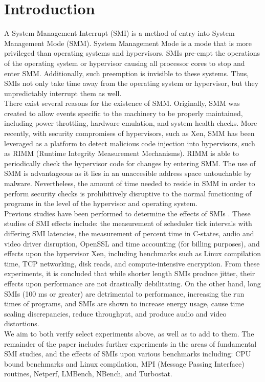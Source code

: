 \documentclass{IEEEtran}
\begin{document}
\section{Introduction}\label{sec:intro}
A System Management Interrupt (SMI) is a method of entry into System Management Mode (SMM). System Management Mode is a mode that is more privileged than operating systems and hypervisors. SMIs pre-empt the operations of the operating system or hypervisor causing all processor cores to stop and enter SMM. Additionally, such preemption is invisible to these systems. Thus, SMIs not only take time away from the operating system or hypervisor, but they unpredictably interrupt them as well.\\
\indent There exist several reasons for the existence of SMM. Originally, SMM was created to allow events specific to the machinery to be properly maintained, including power throttling, hardware emulation, and system health checks. More recently, with security compromises of hypervisors, such as Xen, SMM has been leveraged as a platform to detect malicious code injection into hypervisors, such as RIMM (Runtime Integrity Measurement Mechanisms). RIMM is able to periodically check the hypervisor code for changes by entering SMM. The use of SMM is advantageous as it lies in an unaccesible address space untouchable by malware. Nevertheless, the amount of time needed to reside in SMM in order to perform security checks is prohibitively disruptive to the normal functioning of programs in the level of the hypervisor and operating system.\\
\indent Previous studies have been performed to determine the effects of SMIs \cite{KD}. These studies of SMI effects include: the measurement of scheduler tick intervals with differing SMI latencies, the measurement of percent time in C-states, audio and video driver disruption, OpenSSL and time accounting (for billing purposes), and effects upon the hypervisor Xen, including benchmarks such as Linux compilation time, TCP networking, disk reads, and compute-intensive encryption. From these experiments, it is concluded that while shorter length SMIs produce jitter, their effects upon performance are not drastically debilitating. On the other hand, long SMIs (100 ms or greater) are detrimental to performance, increasing the run times of programs, and SMIs are shown to increase energy usage, cause time scaling discrepancies, reduce throughput, and produce audio and video distortions.\\
\indent We aim to both verify select experiments above, as well as to add to them. The remainder of the paper includes further experiments in the areas of fundamental SMI studies, and the effects of SMIs upon various benchmarks including: CPU bound benchmarks and Linux compilation, MPI (Message Passing Interface) routines, Netperf, LMBench, NBench, and Turbostat.
\end{document}
